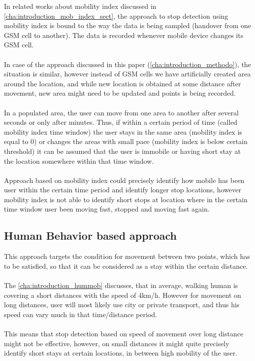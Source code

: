 In related works about mobility index discussed in \autoref{cha:introduction_mob_index_sect}, the approach to stop detection using mobility index is bound to the way the data is being sampled (handover from one GSM cell to another). The data is recorded whenever mobile device changes its GSM cell. 
\\\\
In case of the approach discussed in this paper (\autoref{cha:introduction_methodo}), the situation is similar, however instead of GSM cells we have artificially created area around the location, and while new location is obtained at some distance after movement, new area might need to be updated and points is being recorded.
\\\\
In a populated area, the user can move from one area to another after several seconds or only after minutes. Thus, if within a certain
period of time (called mobility index time window) the user stays in the same area (mobility index is equal to 0) or changes the areas with small pace (mobility index is below certain threshold) it can be assumed that the user is immobile or having short stay at the location somewhere within that time window. 
\\\\
Approach based on mobility index could precisely identify how mobile has been user within the certain time period and identify longer stop locations, however mobility index is not able to identify short stops at location where in the certain time window user been moving fast, stopped and moving fast again. 

\subsection{Human Behavior based approach}

This approach targets the condition for movement between two points, which has to be satisfied, so that it can be considered as a stay within the certain distance. 
\\\\
The \autoref{cha:introduction_hummob} discusses, that in average, walking human is covering a short distances with the speed of 4km/h. However for movement on long distances, user will most likely use city or private transport, and thus his speed can vary much in that time/distance period.
\\\\
This means that stop detection based on speed of movement over long distance might not be effective, however, on small distances it might quite precisely identify short stays at certain locations, in between high mobility of the user.  

